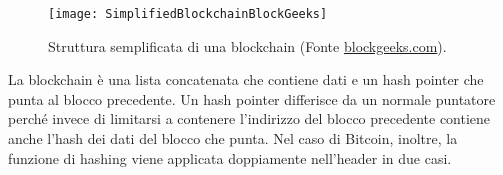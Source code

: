 \begin{figure}[h!]
\centering
\texttt{[image: SimplifiedBlockchainBlockGeeks]}
\caption{Struttura semplificata di una blockchain (Fonte \url{blockgeeks.com}).}
\label{fig:simplifiedblockchainblockgeeks}
\end{figure}


La blockchain è una lista concatenata che contiene dati e un hash pointer che punta al blocco precedente. Un hash pointer differisce da un normale puntatore perché invece di limitarsi a contenere l’indirizzo del blocco precedente contiene anche l’hash dei dati del blocco che punta. Nel caso di Bitcoin, inoltre, la funzione di hashing viene applicata doppiamente nell’header in due casi.\\

\begin{table}[ht]
	\centering
\caption{Struttura dell'header di un blocco Bitcoin (Fonte documentazione ufficiale Bitcoin \cite{bitcoinofficialdoc}).}
\end{table}


